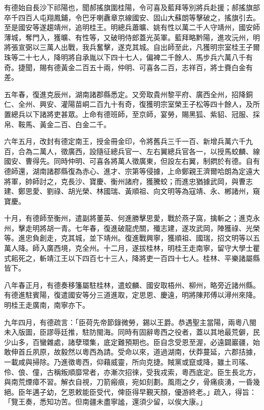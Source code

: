 \begin{pinyinscope}
有德始自長沙下祁陽也，聞郝搖旗圍桂陽，令可喜及藍拜等別將兵赴援；郝搖旗部卒千四百人屯翔鳳鋪，令巴牙喇纛章京線國安、固山大蘇朗等擊破之，搖旗引去。至是國安等遂趨靖州，追明桂王。明總兵蕭曠、姚有性以萬二千人守靖州，國安師薄城，奪門入，獲曠、有性等，又破明侍郎蓋光英軍。藍拜略黔陽，進攻沅州，明將張宣弼以三萬人出戰，我兵奮擊，遂克其城。自出師至此，凡獲明宗室桂王子爾珠等二十七人，降明將自承胤以下四十七人，偏裨二千餘人、馬步兵六萬八千有奇。捷聞，賜有德黃金二百五十兩，仲明、可喜各二百，志祥百，將士賚白金有差。

五年春，復進克辰州，湖南諸郡縣悉定。又旁取貴州黎平府、廣西全州，招降銅仁、全州、興安、灌陽苗峒二百九十有奇，復獲明宗室榮王子松等四十餘人，及所置總兵以下諸將吏甚眾。上命有德班師，至京師，宴勞，賜黑狐、紫貂、冠服、採帛、鞍馬、黃金二百、白金二千。

六年五月，改封有德定南王，授金冊金印，令將舊兵三千一百、新增兵萬六千九百，合為二萬人，徵廣西，設隨征總兵官一、左右翼總兵官各一，以授馬蛟麟、線國安、曹得先。同時仲明、可喜各將萬人徵廣東，但設左右翼，制閷於有德。自有德師還，湖南諸郡縣復為赤心、進才、宗第等侵據，上命鄭親王濟爾哈朗為定遠大將軍，帥師討之，克長沙、寶慶、衡州諸府，獲騰蛟；而進忠猶據武岡，與曹志建、鄭思愛、劉祿、胡光榮、林國瑞、黃順祖、向文明等為寇靖、永、郴諸州，窺寶慶。

十月，有德師至衡州，遣副將董英、何進勝擊思愛，戰於燕子窩，擒斬之；進克永州，擊走明將胡一青。七年春，復進破龍虎關，殲志建，遂攻武岡，陣獲祿、光榮等。進忠負創走，克其城，並下靖州。復進戰興寧，獲順祖、國瑞，招文明等以五萬人降。師入廣西境，克全州。十二月，遂拔桂林，明桂王走南寧，留守大學士瞿式耜死之，斬靖江王以下四百七十三人，降將吏一百四十七人。桂林、平樂諸屬縣皆下。

八年春正月，有德奏移籓屬駐桂林，遣蛟麟、國安取梧州、柳州，略旁近諸州縣。有德進駐賓陽，復遣國安等分三道進取，定思恩、慶遠，明將陳邦傅以潯州來降。明桂王走廣南，南寧亦下。

九年四月，有德疏言：「臣荷先帝節錄微勞，錫以王爵。恭遇聖主當陽，兩粵八閩未入版圖，臣謬辱廷推，駐防閩海。同時有固辭粵西之役者，蓋以其地最荒僻，民少山多，百蠻雜處，諸孽環集，底定難預期也。臣自念受恩至渥，必遠闢巖疆，始敢伸首丘夙原，故毅然以粵西為請。受命以來，道過湖南，伏莽蔓延，六郡拮據，一載咸與掃除。乃進徵粵西，仰藉威靈，所向克捷。賊黨或竄或降，雖土司瑤、伶、俍、僮，古稱叛順靡常者，亦漸次招徠，受我戎索，粵西底定。臣生長北方，與南荒煙瘴不習。解衣自視，刀箭瘢痕，宛如刻劃。風雨之夕，骨痛痰湧，一昏幾絕。臣年邁子幼，乞恩敕能臣受代，俾臣得早覲天顏，優游終老。」疏入，得旨：「覽王奏，悉知功苦。但南疆未盡寧謐，還須少留，以俟大康。」


\end{pinyinscope}
